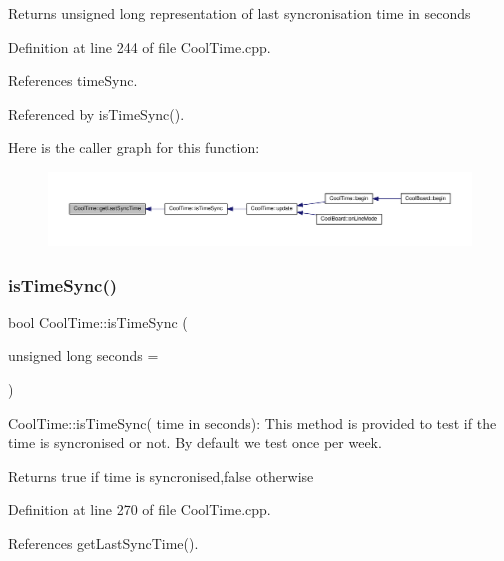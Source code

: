 \begin{DoxyReturn}{Returns}
unsigned long representation of last syncronisation time in seconds 
\end{DoxyReturn}


Definition at line 244 of file Cool\+Time.\+cpp.



References time\+Sync.



Referenced by is\+Time\+Sync().

Here is the caller graph for this function\+:
\nopagebreak
\begin{figure}[H]
\begin{center}
\leavevmode
\includegraphics[width=350pt]{d6/d49/class_cool_time_a5d17f707a9d337720493b2bce9d41c21_icgraph}
\end{center}
\end{figure}
\mbox{\label{class_cool_time_a5ae038a4498602b189f76a10bf02adf8}} 
\subsubsection{\texorpdfstring{is\+Time\+Sync()}{isTimeSync()}}
{\footnotesize\ttfamily bool Cool\+Time\+::is\+Time\+Sync (\begin{DoxyParamCaption}\item[{unsigned long}]{seconds = {} }\end{DoxyParamCaption})}

Cool\+Time\+::is\+Time\+Sync( time in seconds)\+: This method is provided to test if the time is syncronised or not. By default we test once per week.

\begin{DoxyReturn}{Returns}
true if time is syncronised,false otherwise 
\end{DoxyReturn}


Definition at line 270 of file Cool\+Time.\+cpp.



References get\+Last\+Sync\+Time().



